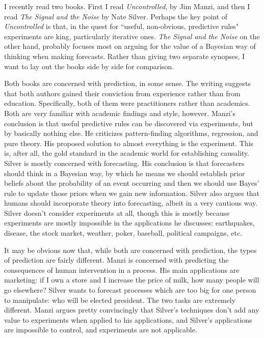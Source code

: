 \documentclass[11pt, oneside]{article}   	%
\title{}
\author{J. Jason Bell}
\begin{document}
\maketitle

I recently read two books.  First I read \textit{Uncontrolled}, by Jim Manzi, and then I read \textit{The Signal and the Noise} by Nate Silver.  Perhaps the key point of \textit{Uncontrolled} is that, in the quest for ``useful, non-obvious, predictive rules" experiments are king, particularly iterative ones.  \textit{The Signal and the Noise} on the other hand, probably focuses most on arguing for the value of a Bayesian way of thinking when making forecasts.  Rather than giving two separate synopses, I want to lay out the books side by side for comparison. 

Both books are concerned with prediction, in some sense.  The writing suggests that both authors gained their conviction from experience rather than from education.  Specifically, both of them were practitioners rather than academics.  Both are very familiar with academic findings and style, however.  Manzi's conclusion is that useful predictive rules can be discovered via experiments, but by basically nothing else.  He criticizes pattern-finding algorithms, regression, and pure theory.  His proposed solution to almost everything is the experiment.  This is, after all, the gold standard in the academic world for establishing causality.  Silver is mostly concerned with forecasting.  His conclusion is that forecasters should think in a Bayesian way, by which he means we should establish prior beliefs about the probability of an event occurring and then we should use Bayes' rule to update those priors when we gain new information.  Silver also argues that humans should incorporate theory into forecasting, albeit in a very cautious way.  Silver doesn't consider experiments at all, though this is mostly because experiments are mostly impossible in the applications he discusses: earthquakes, disease, the stock market, weather, poker, baseball, political campaigns, etc.

It may be obvious now that, while both are concerned with prediction, the types of prediction are fairly different.  Manzi is concerned with predicting the consequences of human intervention in a process.  His main applications are marketing: if I own a store and I increase the price of milk, how many people will go elsewhere?  Silver wants to forecast processes which are too big for one person to manipulate: who will be elected president.  The two tasks are extremely different.  Manzi argues pretty convincingly that Silver's techniques don't add any value to experiments when applied to his applications, and Silver's applications are impossible to control, and experiments are not applicable.
\end{document}
